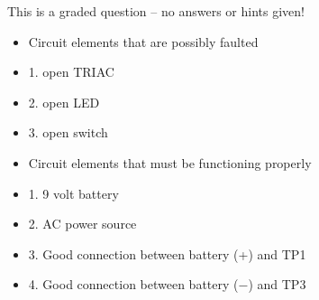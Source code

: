 \vfil 

\eject






This is a graded question -- no answers or hints given!







\begin{itemize}
\item{} Circuit elements that are possibly faulted
\item{1.} open TRIAC 
\item{2.} open LED 
\item{3.} open switch
\end{itemize}

\begin{itemize}
\item{} Circuit elements that must be functioning properly
\item{1.} 9 volt battery
\item{2.} AC power source
\item{3.} Good connection between battery (+) and TP1
\item{4.} Good connection between battery ($-$) and TP3
\end{itemize}




